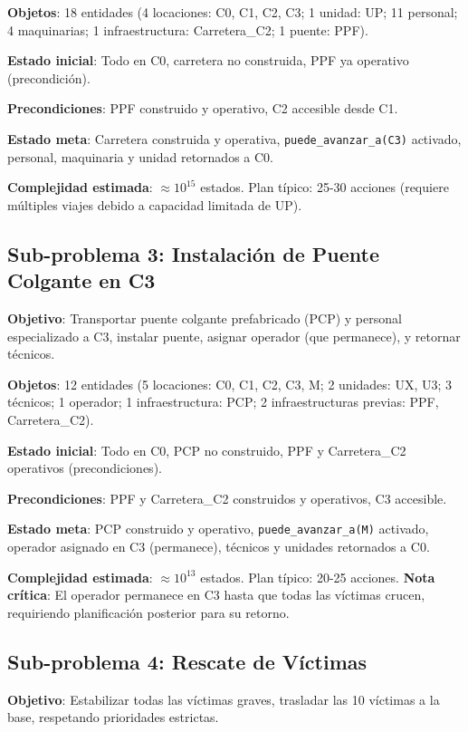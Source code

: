 \documentclass[conference]{IEEEtran}
\begin{document}
    \textbf{Objetos}: 18 entidades (4 locaciones: C0, C1, C2, C3; 1 unidad: UP; 11 personal; 4 maquinarias; 1 infraestructura: Carretera\_C2; 1 puente: PPF).

    \textbf{Estado inicial}: Todo en C0, carretera no construida, PPF ya operativo (precondición).

    \textbf{Precondiciones}: PPF construido y operativo, C2 accesible desde C1.

    \textbf{Estado meta}: Carretera construida y operativa, \texttt{puede\_avanzar\_a(C3)} activado, personal, maquinaria y unidad retornados a C0.

    \textbf{Complejidad estimada}: $\approx 10^{15}$ estados. Plan típico: 25-30 acciones (requiere múltiples viajes debido a capacidad limitada de UP).

    \subsection{Sub-problema 3: Instalación de Puente Colgante en C3}

    \textbf{Objetivo}: Transportar puente colgante prefabricado (PCP) y personal especializado a C3, instalar puente, asignar operador (que permanece), y retornar técnicos.

    \textbf{Objetos}: 12 entidades (5 locaciones: C0, C1, C2, C3, M; 2 unidades: UX, U3; 3 técnicos; 1 operador; 1 infraestructura: PCP; 2 infraestructuras previas: PPF, Carretera\_C2).

    \textbf{Estado inicial}: Todo en C0, PCP no construido, PPF y Carretera\_C2 operativos (precondiciones).

    \textbf{Precondiciones}: PPF y Carretera\_C2 construidos y operativos, C3 accesible.

    \textbf{Estado meta}: PCP construido y operativo, \texttt{puede\_avanzar\_a(M)} activado, operador asignado en C3 (permanece), técnicos y unidades retornados a C0.

    \textbf{Complejidad estimada}: $\approx 10^{13}$ estados. Plan típico: 20-25 acciones. \textbf{Nota crítica}: El operador permanece en C3 hasta que todas las víctimas crucen, requiriendo planificación posterior para su retorno.

    \subsection{Sub-problema 4: Rescate de Víctimas}

    \textbf{Objetivo}: Estabilizar todas las víctimas graves, trasladar las 10 víctimas a la base, respetando prioridades estrictas.
\end{document}
